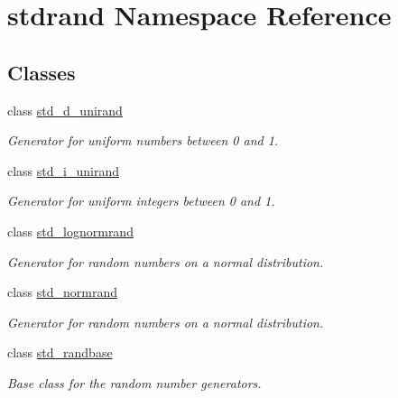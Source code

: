 \hypertarget{namespacestdrand}{}\section{stdrand Namespace Reference}
\label{namespacestdrand}
\subsection*{Classes}
\begin{DoxyCompactItemize}
\item 
class \hyperlink{classstdrand_1_1std__d__unirand}{std\+\_\+d\+\_\+unirand}
\begin{DoxyCompactList}\small\item\em Generator for uniform numbers between 0 and 1. \end{DoxyCompactList}\item 
class \hyperlink{classstdrand_1_1std__i__unirand}{std\+\_\+i\+\_\+unirand}
\begin{DoxyCompactList}\small\item\em Generator for uniform integers between 0 and 1. \end{DoxyCompactList}\item 
class \hyperlink{classstdrand_1_1std__lognormrand}{std\+\_\+lognormrand}
\begin{DoxyCompactList}\small\item\em Generator for random numbers on a normal distribution. \end{DoxyCompactList}\item 
class \hyperlink{classstdrand_1_1std__normrand}{std\+\_\+normrand}
\begin{DoxyCompactList}\small\item\em Generator for random numbers on a normal distribution. \end{DoxyCompactList}\item 
class \hyperlink{classstdrand_1_1std__randbase}{std\+\_\+randbase}
\begin{DoxyCompactList}\small\item\em Base class for the random number generators. \end{DoxyCompactList}\end{DoxyCompactItemize}
